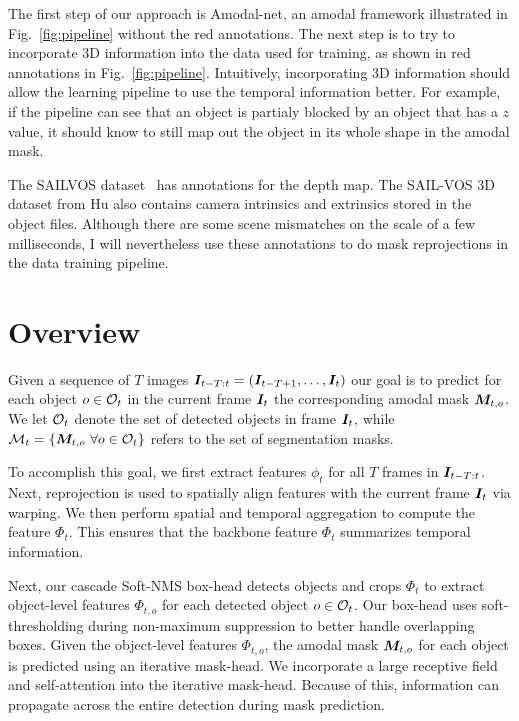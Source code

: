 The first step of our approach is Amodal-net, an amodal framework illustrated in Fig.~\ref{fig:pipeline} without the red annotations. The next step is to try to incorporate 3D information into the data used for training, as shown in red annotations in Fig.~\ref{fig:pipeline}. Intuitively,  incorporating 3D information should allow the learning pipeline to use the temporal information better. For example, if the pipeline can see that an object is partialy blocked by an object that has a $z$ value, it should know to still map out the object in its whole shape in the amodal mask. 

The SAILVOS dataset~\cite{hu2019sail} has annotations for the depth map. The SAIL-VOS 3D dataset from Hu \etal \cite{HuCVPR2021} also contains camera intrinsics and extrinsics stored in the object files. Although there are some scene mismatches on the scale of a few milliseconds, I will nevertheless use these annotations to do mask reprojections in the data training pipeline.

\section{Overview}
Given a sequence of $T$ images ${\bm{I}}_{t-T:t}=({\bm{I}}_{t-T+1}, \hdots, {\bm{I}}_{t})$ our goal is to predict for each object $o\in{\mathcal{O}}_t$ in the current frame ${\bm{I}}_t$ the corresponding amodal mask ${\bm{M}}_{t,o}$. 
We let ${\mathcal{O}}_t$ denote the set of detected objects in frame ${\bm{I}}_t$, while ${\mathcal{M}}_t = \{{\bm{M}}_{t,o}~\forall o \in {\mathcal{O}}_t\}$ refers to the set of segmentation masks.

To accomplish this goal, we first extract features $\phi_t$ for all $T$ frames in ${\bm{I}}_{t-T:t}$. %
Next, reprojection is used to spatially align features with the current frame ${\bm{I}}_t$ via warping. We then perform spatial and temporal aggregation to compute the feature $\Phi_t$. This ensures that the backbone feature $\Phi_t$ summarizes temporal information. 

Next, our cascade Soft-NMS box-head detects objects and crops $\Phi_t$ to extract object-level features $\Phi_{t,o}$ for each detected object $o\in{\mathcal{O}}_t$. Our box-head uses soft-thresholding during non-maximum suppression to better handle overlapping boxes. Given the object-level features $\Phi_{t,o}$, the amodal mask ${\bm{M}}_{t,o}$ for each object is predicted using an iterative mask-head. We incorporate a large receptive field and self-attention into the iterative mask-head. %
Because of this, information can propagate across the entire detection during mask prediction.


